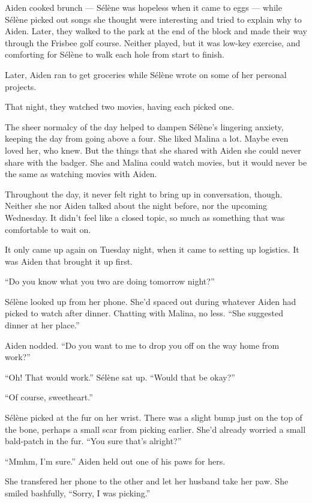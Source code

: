 Aiden cooked brunch --- Sélène was hopeless when it came to eggs --- while Sélène picked out songs she thought were interesting and tried to explain why to Aiden. Later, they walked to the park at the end of the block and made their way through the Frisbee golf course. Neither played, but it was low-key exercise, and comforting for Sélène to walk each hole from start to finish.

Later, Aiden ran to get groceries while Sélène wrote on some of her personal projects.

That night, they watched two movies, having each picked one.

The sheer normalcy of the day helped to dampen Sélène's lingering anxiety, keeping the day from going above a four. She liked Malina a lot. Maybe even loved her, who knew. But the things that she shared with Aiden she could never share with the badger. She and Malina could watch movies, but it would never be the same as watching movies with Aiden.

Throughout the day, it never felt right to bring up in conversation, though. Neither she nor Aiden talked about the night before, nor the upcoming Wednesday. It didn't feel like a closed topic, so much as something that was comfortable to wait on.

It only came up again on Tuesday night, when it came to setting up logistics. It was Aiden that brought it up first.

``Do you know what you two are doing tomorrow night?''

Sélène looked up from her phone. She'd spaced out during whatever Aiden had picked to watch after dinner. Chatting with Malina, no less. ``She suggested dinner at her place.''

Aiden nodded. ``Do you want to me to drop you off on the way home from work?''

``Oh! That would work.'' Sélène sat up. ``Would that be okay?''

``Of course, sweetheart.''

Sélène picked at the fur on her wrist. There was a slight bump just on the top of the bone, perhaps a small scar from picking earlier. She'd already worried a small bald-patch in the fur. ``You sure that's alright?''

``Mmhm, I'm sure.'' Aiden held out one of his paws for hers.

She transfered her phone to the other and let her husband take her paw. She smiled bashfully, ``Sorry, I was picking.''

